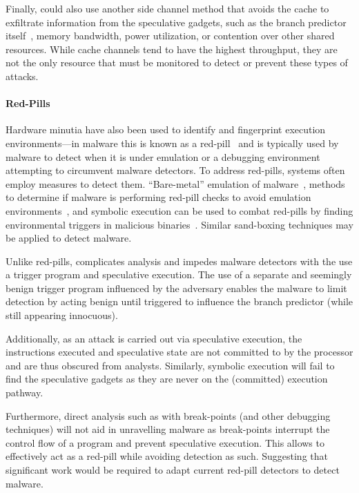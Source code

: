 Finally, \speculake could also use another side channel method that
avoids the cache
to exfiltrate information from the speculative gadgets, such as the branch
predictor itself~\cite{evtyushkin2018branchscope}, memory bandwidth, power
utilization, or contention over other shared resources. While cache 
channels tend to have the highest throughput, they are not the only 
resource that must be monitored to detect or prevent these types of attacks. 

\paragraph{Red-Pills}
Hardware minutia have also been used to identify and fingerprint execution
environments---in malware this is known as a red-pill~\cite{red-pill} and is
typically used by malware to detect when it is under emulation or a debugging
environment~\cite{lindorfer2011detecting, balzarotti2010efficient,
paleari2009fistful} attempting to circumvent malware detectors. To address
red-pills, systems often employ measures to detect them. ``Bare-metal''
emulation of malware~\cite{kirat2011barebox}, methods to determine if malware is
performing red-pill checks to avoid emulation
environments~\cite{kirat2014barecloud}, and symbolic execution can be used to
combat red-pills by finding environmental triggers in malicious
binaries~\cite{schwartz2010all}. Similar sand-boxing techniques may be applied
to detect \speculake malware.

Unlike red-pills, \speculake complicates analysis and impedes malware detectors
with the use a trigger program and speculative execution. The use of a separate
and seemingly benign trigger program influenced by the adversary enables the
\speculake malware to limit detection by acting benign until triggered to
influence the branch predictor (while still appearing innocuous). 

Additionally, as an \speculake attack is carried out via speculative execution,
the instructions executed and speculative state are not committed to by the
processor and are thus obscured from analysts. Similarly, symbolic execution
will fail to find the speculative gadgets as they are never on the (committed)
execution pathway. 

Furthermore, direct analysis such as with break-points (and other
debugging techniques) will not aid in unravelling \speculake malware as
break-points interrupt the control flow of a program and prevent speculative
execution. This allows \speculake to effectively act as a red-pill while
avoiding detection as such. Suggesting that significant work would be required
to adapt current red-pill detectors to detect \speculake malware.

